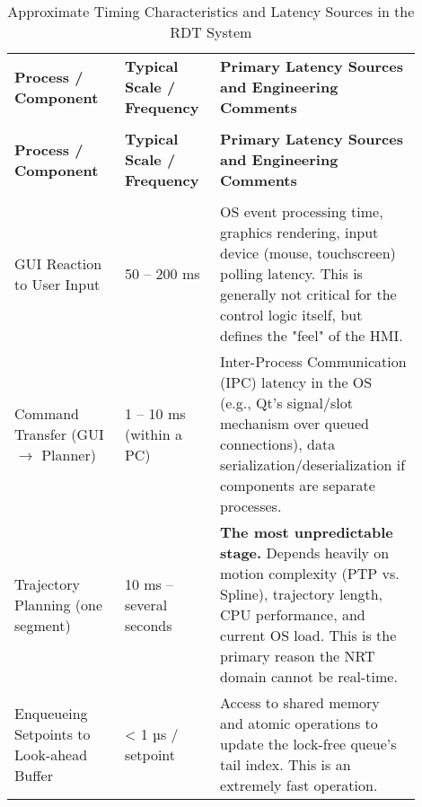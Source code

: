 \renewcommand{\arraystretch}{1.2} %
\begin{longtable}{p{0.25\linewidth} p{0.2\linewidth} p{0.45\linewidth}}
    \caption{Approximate Timing Characteristics and Latency Sources in the RDT System}\label{tab:timing_characteristics}\\
    \toprule %
    \textbf{Process / Component} &
    \textbf{Typical Scale / Frequency} &
    \textbf{Primary Latency Sources and Engineering Comments} \\
    \addlinespace[3pt] %
    \toprule %
    \endfirsthead

    \multicolumn{3}{c}{\tablename~\thetable{} -- continued from previous page} \\
    \toprule %
    \textbf{Process / Component} &
    \textbf{Typical Scale / Frequency} &
    \textbf{Primary Latency Sources and Engineering Comments} \\
    \addlinespace[3pt] %
    \toprule %
    \endhead

    \bottomrule %
    \endfoot

    \bottomrule %
    \endlastfoot

    \multicolumn{3}{c}{\textbf{NRT-Domain: Planning \& Coordination}} \\ %
    \midrule %
    GUI Reaction to User Input & 50 – 200 ms & OS event processing time, graphics rendering, input device (mouse, touchscreen) polling latency. This is generally not critical for the control logic itself, but defines the "feel" of the HMI. \\
    \midrule %
    Command Transfer (GUI \(\rightarrow\) Planner) & 1 – 10 ms (within a PC) & Inter-Process Communication (IPC) latency in the OS (e.g., Qt's signal/slot mechanism over queued connections), data serialization/deserialization if components are separate processes. \\
    \midrule %
    Trajectory Planning (one segment) & 10 ms – several seconds & \textbf{The most unpredictable stage.} Depends heavily on motion complexity (PTP vs. Spline), trajectory length, CPU performance, and current OS load. This is the primary reason the NRT domain cannot be real-time. \\
    \midrule %
    Enqueueing Setpoints to Look-ahead Buffer & < 1 µs / setpoint & Access to shared memory and atomic operations to update the lock-free queue's tail index. This is an extremely fast operation. \\
    \midrule %


\end{longtable}
